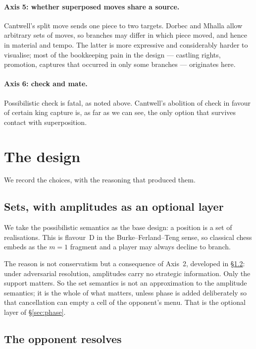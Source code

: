 \documentclass[11pt,a4paper]{article}
\theoremstyle{definition}
\theoremstyle{plain}
\begin{document}
\paragraph{Axis 5: whether superposed moves share a source.}
Cantwell's split move sends one piece to two targets. Dorbec and Mhalla allow
arbitrary sets of moves, so branches may differ in which piece moved, and hence
in material and tempo. The latter is more expressive and considerably harder to
visualise; most of the bookkeeping pain in the design --- castling rights,
promotion, captures that occurred in only some branches --- originates here.

\paragraph{Axis 6: check and mate.}
Possibilistic check is fatal, as noted above. Cantwell's abolition of check in
favour of certain king capture is, as far as we can see, the only option that
survives contact with superposition.

\section{The design}
\label{sec:design}

We record the choices, with the reasoning that produced them.

\subsection{Sets, with amplitudes as an optional layer}

We take the possibilistic semantics as the base design: a position is a set of
realisations. This is flavour~D in the Burke--Ferland--Teng sense, so classical
chess embeds as the $m=1$ fragment and a player may always decline to branch.

The reason is not conservatism but a consequence of Axis~2, developed in
\S\ref{sec:design:adversarial}: under adversarial resolution, amplitudes carry
no strategic information. Only the support matters. So the set semantics is not
an approximation to the amplitude semantics; it is the whole of what matters,
unless phase is added deliberately so that cancellation can empty a cell of the
opponent's menu. That is the optional layer of \S\ref{sec:phase}.

\subsection{The opponent resolves}
\label{sec:design:adversarial}
\end{document}
